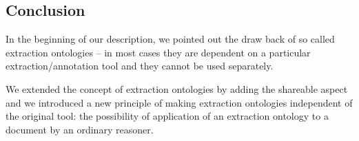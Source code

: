 \subsection{Conclusion} \label{sec:onto_conclusion}


   
In the beginning of our description, we pointed out the draw back of so called extraction ontologies -- in most cases they are dependent on a particular extraction/annotation tool and they cannot be used separately.	

We extended the concept of extraction ontologies by adding the shareable aspect and we introduced a new principle of making extraction ontologies independent of the original tool: the possibility of application of an extraction ontology to a document by an ordinary reasoner.

